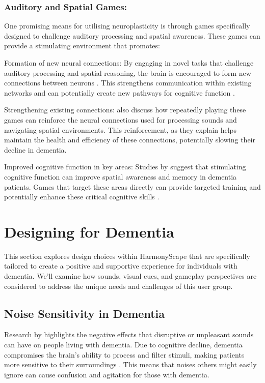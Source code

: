 \documentclass{l4proj}
\begin{document}
\subsubsection{Auditory and Spatial Games:}
One promising means for utilising neuroplasticity is through games specifically designed to challenge auditory processing and spatial awareness. These games can provide a stimulating environment that promotes:

Formation of new neural connections: By engaging in novel tasks that challenge auditory processing and spatial reasoning, the brain is encouraged to form new connections between neurons \citep{park_aging_2013}. This strengthens communication within existing networks and can potentially create new pathways for cognitive function \citep{park_aging_2013}.

Strengthening existing connections: \cite{park_aging_2013} also discuss how repeatedly playing these games can reinforce the neural connections used for processing sounds and navigating spatial environments. This reinforcement, as they explain helps maintain the health and efficiency of these connections, potentially slowing their decline in dementia.

Improved cognitive function in key areas: Studies by \cite{boggio_non-invasive_2011} suggest that stimulating cognitive function can improve spatial awareness and memory in dementia patients. Games that target these areas directly can provide targeted training and potentially enhance these critical cognitive skills \citep{park_aging_2013}.

\section{Designing for Dementia}
This section explores design choices within HarmonyScape that are specifically tailored to create a positive and supportive experience for individuals with dementia. We'll examine how sounds, visual cues, and gameplay perspectives are considered to address the unique needs and challenges of this user group.

\subsection{Noise Sensitivity in Dementia}\label{sec:noise_sensitivity}
Research by \cite{shirsat_music_nodate} highlights the negative effects that disruptive or unpleasant sounds can have on people living with dementia. Due to cognitive decline, dementia compromises the brain's ability to process and filter stimuli, making patients more sensitive to their surroundings \citep{shirsat_music_nodate}. This means that noises others might easily ignore can cause confusion and agitation for those with dementia.
\end{document}

